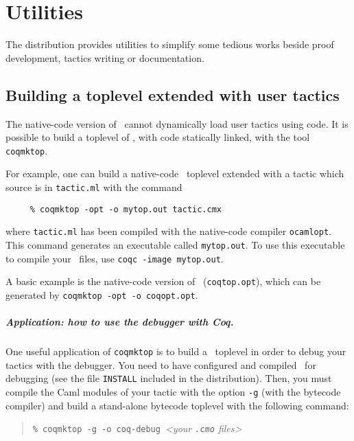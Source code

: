 \chapter[Utilities]{Utilities\label{Utilities}}

The distribution provides utilities to simplify some tedious works
beside proof development, tactics writing or documentation.

\section[Building a toplevel extended with user tactics]{Building a toplevel extended with user tactics\label{Coqmktop}}

The native-code version of \Coq\ cannot dynamically load user tactics
using {\ocaml} code. It is possible to build a toplevel of \Coq,
with {\ocaml} code statically linked, with the tool {\tt
  coqmktop}.

For example, one can build a native-code \Coq\ toplevel extended with a tactic
which source is in {\tt tactic.ml} with the command
\begin{verbatim}
     % coqmktop -opt -o mytop.out tactic.cmx
\end{verbatim}
where {\tt tactic.ml} has been compiled with the native-code
compiler {\tt ocamlopt}. This command generates an executable
called {\tt mytop.out}. To use this executable to compile your \Coq\
files, use {\tt coqc -image mytop.out}.

A basic example is the native-code version of \Coq\ ({\tt coqtop.opt}),
which can be generated by {\tt coqmktop -opt -o coqopt.opt}.


\paragraph[Application: how to use the {\ocaml} debugger with Coq.]{Application: how to use the {\ocaml} debugger with Coq.}

One useful application of \texttt{coqmktop} is to build a \Coq\ toplevel in
order to debug your tactics with the {\ocaml} debugger.
You need to have configured and compiled \Coq\ for debugging
(see the file \texttt{INSTALL} included in the distribution).
Then, you must compile the Caml modules of your tactic with the
option \texttt{-g} (with the bytecode compiler) and build a stand-alone
bytecode toplevel with the following command:

\begin{quotation}
\texttt{\% coqmktop -g -o coq-debug}~\emph{<your \texttt{.cmo} files>}
\end{quotation}


